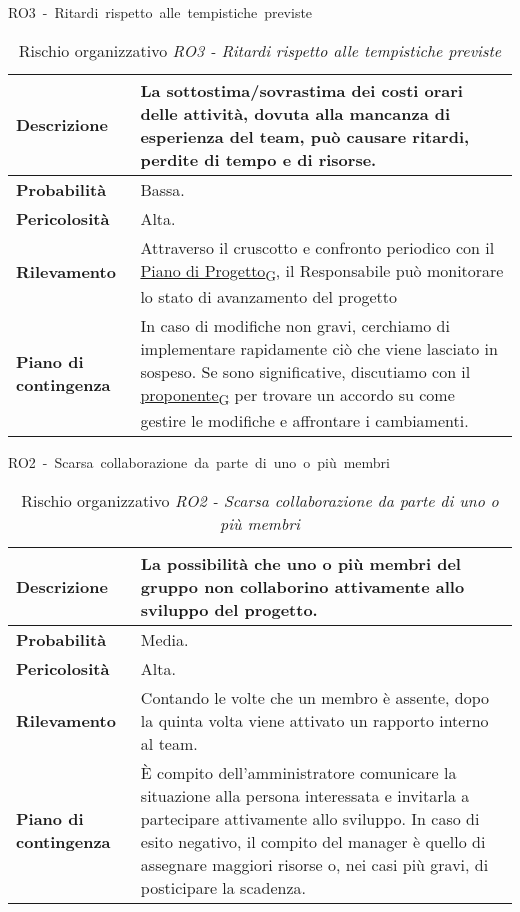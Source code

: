 \begin{table}[!h]
    \centering
    \hbox{RO3 - Ritardi rispetto alle tempistiche previste}
    \vspace{0.3cm}
	\begin{tabular}{|l|p{10cm}|} 
		\hline
		\textbf{Descrizione} & La sottostima/sovrastima dei costi orari delle attività, dovuta alla mancanza di esperienza del team, può causare ritardi, perdite di tempo e di risorse. \\ 
        \hline
        \textbf{Probabilità} & Bassa. \\
        \hline
        \textbf{Pericolosità} & Alta. \\
        \hline
        \textbf{Rilevamento} & Attraverso il cruscotto e confronto periodico con il \href{https://7last.github.io/docs/rtb/documentazione-interna/glossario\#piano-di-progetto}{Piano di Progetto\textsubscript{G}}, il Responsabile può monitorare lo stato di avanzamento del progetto \\
        \hline
        \textbf{Piano di contingenza} & In caso di modifiche non gravi, cerchiamo di implementare rapidamente ciò che viene lasciato in sospeso. Se sono significative, discutiamo con il \href{https://7last.github.io/docs/rtb/documentazione-interna/glossario\#proponente}{proponente\textsubscript{G}} per trovare un accordo su come gestire le modifiche e affrontare i cambiamenti.\\
		\hline
	\end{tabular}
    \caption{Rischio organizzativo \textit{RO3 - Ritardi rispetto alle tempistiche previste}}
    \label{table:3}
\end{table}
\begin{table}[!h]
    \centering
    \hbox{RO2 - Scarsa collaborazione da parte di uno o più membri}
    \vspace{0.3cm}
	\begin{tabular}{|l|p{10cm}|} 
		\hline
		\textbf{Descrizione} & La possibilità che uno o più membri del gruppo non collaborino attivamente allo sviluppo del progetto. \\ 
        \hline
        \textbf{Probabilità} & Media. \\
        \hline
        \textbf{Pericolosità} & Alta. \\
        \hline
        \textbf{Rilevamento} & Contando le volte che un membro è assente, dopo la quinta volta viene attivato un rapporto interno al team.\\
        \hline
        \textbf{Piano di contingenza} & È compito dell'amministratore comunicare la situazione alla persona interessata e invitarla a partecipare attivamente allo sviluppo. In caso di esito negativo, il compito del manager è quello di assegnare maggiori risorse o, nei casi più gravi, di posticipare la scadenza.\\
		\hline
	\end{tabular}
    \caption{Rischio organizzativo \textit{RO2 - Scarsa collaborazione da parte di uno o più membri}}
    \label{table:4}
\end{table}

